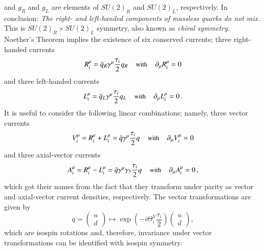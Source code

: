 \documentclass[sort&compress,preprint,3p]{elsarticle}
\begin{document}
and $g_R$ and $g_L$  are elements of 
$SU(2)_R$ and $SU(2)_L$, respectively. 
In conclusion: {\it The right- and left-handed components of
massless quarks do not mix.} 
This is
$SU(2)_R\times SU(2)_L$ 
symmetry, also known as {\it chiral symmetry}.
Noether's Theorem implies the existence of
six conserved currents;
three right-handed currents
\begin{equation}
R^\mu_i = \bar{q}_R \gamma^\mu \frac{\tau_i}{2} q_R 
\;\;\;\; \mbox{\small\rm with} \;\;\;\; \partial_\mu R^\mu_i = 0
\end{equation}
and three left-handed currents
\begin{equation}
L^\mu_i = \bar{q}_L \gamma^\mu \frac{\tau_i}{2} q_L 
\;\;\;\; \mbox{\small\rm with} \;\;\;\; \partial_\mu L^\mu_i = 0
\,.
\end{equation}
It is useful to consider the following linear
combinations; namely,
three vector currents
\begin{equation}
V^\mu_i = R^\mu_i + L^\mu_i = \bar{q} \gamma^\mu \frac{\tau_i}{2} q
\;\;\;\; \mbox{\small\rm with} \;\;\;\; \partial_\mu V^\mu_i = 0
\label{eq_Vmu}
\end{equation}
and three axial-vector currents
\begin{equation}
A^\mu_i = R^\mu_i - L^\mu_i = \bar{q} \gamma^\mu \gamma_5 
\frac{\tau_i}{2} q
\;\;\;\; \mbox{\small\rm with} \;\;\;\; \partial_\mu A^\mu_i = 0
\,,
\label{eq_Amu}
\end{equation}
which got their names from the fact that they
transform under parity as vector and axial-vector current densities, respectively.
The vector
transformations are given by
\begin{equation}
q =
\left( \begin{array}{c}
u \\ d
\end{array} \right)
\longmapsto
\exp
\left(
-i \Theta_i^V \frac{\tau_i}{2}
\right)
\left( \begin{array}{c}
u \\ d
\end{array} \right) ,
\end{equation}
which are isospin rotations
and, therefore, invariance under vector transformations can be
identified with isospin symmetry.
\end{document}
